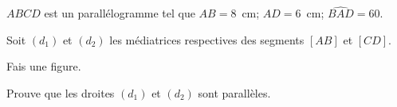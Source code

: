 $ABCD$ est un parallélogramme tel que $AB=8$~cm; $AD=6$~cm;
$\widehat{BAD}=60$\degres.
\par Soit $(d_1)$ et $(d_2)$ les médiatrices respectives des segments
$[AB]$ et $[CD]$.
\begin{myenumerate}
\item Fais une figure.
\item Prouve que les droites $(d_1)$ et $(d_2)$ sont parallèles.
\end{myenumerate}